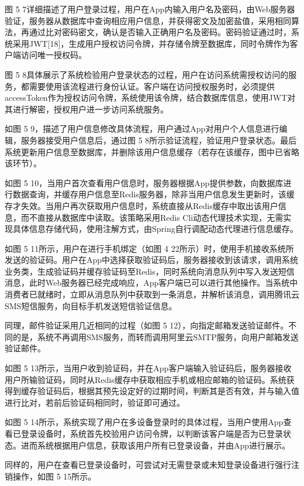 \documentclass[oneside]{jufethesis}
\begin{document}
图 5 7详细描述了用户登录过程，用户在App内输入用户名及密码，由Web服务器验证，服务器从数据库中查询相应用户信息，并获得密文及加密盐值，采用相同算法，再通过比对密码密文，确认是否输入正确用户名及密码。密码验证通过时，系统采用JWT[18]，生成用户授权访问令牌，并存储令牌至数据库，同时令牌作为客户端访问唯一授权码。

图 5 8具体展示了系统检验用户登录状态的过程，用户在访问系统需授权访问的服务，都需要使用该流程进行身份认证。客户端在访问授权服务时，必须提供accessToken作为授权访问令牌，系统使用该令牌，结合数据库信息，使用JWT对其进行解密，授权用户进一步访问系统服务。
 
如图 5 9，描述了用户信息修改具体流程，用户通过App对用户个人信息进行编辑，服务器接受用户信息后，通过图 5 8所示验证流程，验证用户登录状态。最后系统更新用户信息至数据库，并删除该用户信息缓存（若存在该缓存，图中已省略该环节）。
 

如图 5 10，当用户首次查看用户信息时，服务器根据App提供参数，向数据库进行数据查询，并缓存用户信息至Redis服务器，除非当用户信息发生更新时，该缓存才失效。当用户再次获取用户信息时，系统直接从Redis缓存中取出该用户信息，而不直接从数据库中读取。该策略采用Redis Cli动态代理技术实现，无需实现具体信息存储代码，使用注解方式，由Spring自行调配动态代理进行信息缓存。
 
如图 5 11所示，用户在进行手机绑定（如图 4 22所示）时，使用手机接收系统所发送的验证码。用户在App中选择获取验证码后，服务器接收到该请求，调用系统业务类，生成验证码并缓存验证码至Redis，同时系统向消息队列中写入发送短信消息，此时Web服务器已经完成响应，App客户端已可以进行其他操作。当系统中消费者已就绪时，立即从消息队列中获取到一条消息，并解析该消息，调用腾讯云SMS短信服务，向目标手机发送短信验证信息。

同理，邮件验证采用几近相同的过程（如图 5 12），向指定邮箱发送验证邮件。不同的是，系统不再调用SMS服务，而转而调用阿里云SMTP服务，向用户邮箱发送验证邮件。
 
如图 5 13所示，当用户收到验证码，并在App客户端输入验证码后，服务器接收用户所输验证码，同时从Redis缓存中获取相应手机或相应邮箱的验证码。系统获得到缓存验证码后，根据其预先设定好的过期时间，判断其是否有效，并与输入值进行比对，若前后验证码相同时，验证即可通过。
 
如图 5 14所示，系统实现了用户在多设备登录时的具体过程，当用户使用App查看已登录设备时，系统首先校验用户访问令牌，以判断该客户端是否为已登录状态。进而系统根据用户信息，获取该用户所有已登录设备，并由App进行展示。

同样的，用户在查看已登录设备时，可尝试对无需登录或未知登录设备进行强行注销操作，如图 5 15所示。
\end{document}
